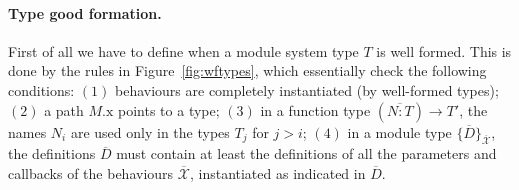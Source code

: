 \documentclass[a4paper,10pt]{article}
\newcommand{\tx}{\textrm{x}}
\newcommand{\BX}{\ensuremath{\mathcal{X}}}
\begin{document}
\paragraph{Type good formation.} First of all we have to define when a module system type $T$ is well formed. This is done by the rules in Figure~\ref{fig:wftypes}, which essentially check the following conditions: $(1)$ behaviours are completely instantiated (by well-formed types); $(2)$ a path $M.\tx$ points to a type; $(3)$ in a function type $(\overline{N:T})\to T'$, the names $N_i$ are  used only in the types $T_j$ for $j>i$; $(4)$ in a module type $\{\overline{D}\}_{\overline{\BX}}$, the definitions $\overline{D}$ must contain at least the definitions of all the parameters and callbacks of the behaviours $\overline{\BX}$, instantiated as indicated in $\overline{D}$. 
\end{document}
